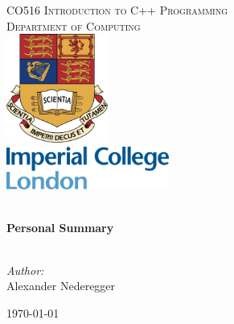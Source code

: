 \begin{titlepage}
\vbox{ }
\vbox{ }

\begin{center}
\textsc{\LARGE CO516 Introduction to C++ Programming} \\[1.5cm]
\textsc{\Large Department of Computing}\\[0.5cm]

\vbox{}
\vbox{}
\vbox{}
\includegraphics[width=0.25\textwidth]{./1_title/images/ic_wappen}\\[1cm]
\vbox{}
\includegraphics[width=0.4\textwidth]{./1_title/images/ic_logo}\\[1cm]
\vbox{}
\vbox{}

\HRule \\[0.4cm]
{ \huge \bfseries Personal Summary}\\[0.2cm]
\HRule \\[1.5cm]

\begin{center} \large
\emph{Author:}\\
Alexander Nederegger
\end{center}

\vbox{}
\vbox{}
\vbox{}
\vbox{}
{\large \today}

\end{center}
\end{titlepage}